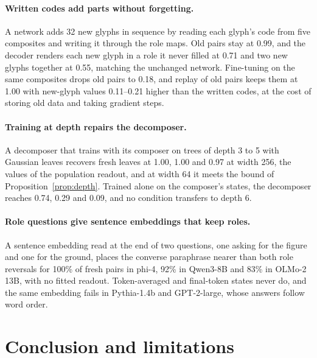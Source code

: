 \documentclass[10pt]{article}
\theoremstyle{plain}
\theoremstyle{remark}
\begin{document}
\paragraph{Written codes add parts without forgetting.} A network adds 32 new glyphs in sequence by reading each glyph's code from five composites and writing it through the role maps. Old pairs stay at 0.99, and the decoder renders each new glyph in a role it never filled at 0.71 and two new glyphs together at 0.55, matching the unchanged network. Fine-tuning on the same composites drops old pairs to 0.18, and replay of old pairs keeps them at 1.00 with new-glyph values 0.11--0.21 higher than the written codes, at the cost of storing old data and taking gradient steps.

\paragraph{Training at depth repairs the decomposer.} A decomposer that trains with its composer on trees of depth 3 to 5 with Gaussian leaves recovers fresh leaves at 1.00, 1.00 and 0.97 at width 256, the values of the population readout, and at width 64 it meets the bound of Proposition~\ref{prop:depth}. Trained alone on the composer's states, the decomposer reaches 0.74, 0.29 and 0.09, and no condition transfers to depth 6.

\paragraph{Role questions give sentence embeddings that keep roles.} A sentence embedding read at the end of two questions, one asking for the figure and one for the ground, places the converse paraphrase nearer than both role reversals for 100\% of fresh pairs in phi-4, 92\% in Qwen3-8B and 83\% in OLMo-2 13B, with no fitted readout. Token-averaged and final-token states never do, and the same embedding fails in Pythia-1.4b and GPT-2-large, whose answers follow word order.

\section{Conclusion and limitations}
\label{sec:discussion}
\end{document}
